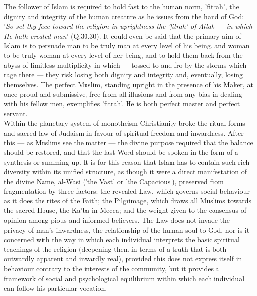 \documentclass[10pt, twoside]{book}
\begin{document}
The follower of Islam is required to hold fast to the human norm, 'fitrah', the dignity and integrity 
of the human creature as he issues from the hand of God: '\emph{So set thy face toward the religion in 
uprightness the 'fitrah' of Allah --- in which He hath created man}' (Q.30.30). It could even be said 
that the primary aim of Islam is to persuade man to be truly man at every level of his being, and 
woman to be truly woman at every level of her being, and to hold them back from the abyss of 
limitless multiplicity in which --- tossed to and fro by the storms which rage there --- they risk losing 
both dignity and integrity and, eventually, losing themselves. The perfect Muslim, standing upright 
in the presence of his Maker, at once proud and submissive, free from all illusions and from any bias 
in dealing with his fellow men, exemplifies 'fitrah'. He is both perfect master and perfect servant. \\

Within the planetary system of monotheism Christianity broke the ritual forms and sacred law of 
Judaism in favour of spiritual freedom and inwardness. After this --- as Muslims see the matter --- the 
divine purpose required that the balance should be restored, and that the last Word should be spoken 
in the form of a synthesis or summing\hyp{}up. It is for this reason that Islam has to contain such rich 
diversity within its unified structure, as though it were a direct manifestation of the divine Name, 
al\hyp{}Wasi ('the Vast' or 'the Capacious'), preserved from fragmentation by three factors: the revealed 
Law, which governs social behaviour as it does the rites of the Faith; the Pilgrimage, which draws 
all Muslims towards the sacred House, the Ka'ba in Mecca; and the weight given to the consensus of 
opinion among pious and informed believers. The Law does not invade the privacy of man's inwardness, 
the relationship of the human soul to God, nor is it concerned with the way in which each individual 
interprets the basic spiritual teachings of the religion (deepening them in terms of a truth that is 
both outwardly apparent and inwardly real), provided this does not express itself in behaviour 
contrary to the interests of the community, but it provides a framework of social and psychological 
equilibrium within which each individual can follow his particular vocation. \\
\end{document}
